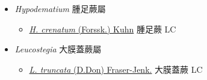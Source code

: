 
  \begin{itemize}
 \item[] \textit{Hypodematium} 腫足蕨屬
                    
  \begin{itemize}
        \item[] \href{http://www.theplantlist.org/tpl1.1/search?q=Hypodematium+crenatum}{\textit{H. crenatum} (Forssk.) Kuhn}   腫足蕨 LC
  \end{itemize}
 \item[] \textit{Leucostegia} 大膜蓋蕨屬
                    
  \begin{itemize}
        \item[] \href{http://www.theplantlist.org/tpl1.1/search?q=Leucostegia+truncata}{\textit{L. truncata} (D.Don) Fraser-Jenk.}     大膜蓋蕨 LC
  \end{itemize}
  \end{itemize}
